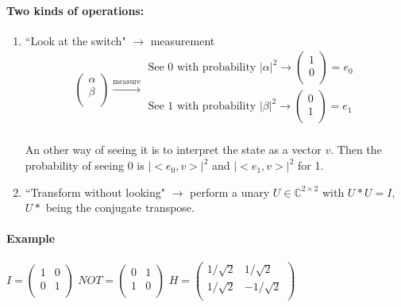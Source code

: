 \documentclass{article}
\begin{document}
\paragraph{Two kinds of operations:}
\begin{enumerate}
\item ``Look at the switch" $\to$ measurement
\[
\begin{pmatrix}
\alpha\\
\beta\\
\end{pmatrix}
\overset{\text{measure}}{\to}
\begin{matrix}
\text{See 0 with probability $|\alpha|^2$} \to \begin{pmatrix}
1\\ 0 \\
\end{pmatrix} = e_0 \\
\text{See 1 with probability $|\beta|^2$} \to \begin{pmatrix}
0\\ 1 \\
\end{pmatrix} = e_1 \\
\end{matrix}
\]

An other way of seeing it is to interpret the state as a vector $v$. Then the probability of seeing 0 is $|<e_0,v>|^2$ and $|<e_1,v>|^2$ for 1. 

\item ``Transform without looking" $\to$ perform a unary $U\in \mathbb{C}^{2\times 2}$ with $U*U=I$, $U*$ being the conjugate transpose.
\end{enumerate}

\paragraph{Example}
$I=\begin{pmatrix}
1 & 0\\
0&1\\
\end{pmatrix}
$
$NOT=\begin{pmatrix}
0&1\\
1 & 0\\
\end{pmatrix}
$
$H=\begin{pmatrix}
1/\sqrt{2} & 1/\sqrt{2}\\
1/\sqrt{2} & -1/\sqrt{2}\\
\end{pmatrix}
$
\end{document}
